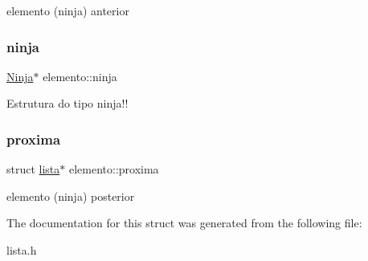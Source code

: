 elemento (ninja) anterior \mbox{\label{structelemento_af16aea73cc75aa4568de78596150bc05}} 
\subsubsection{\texorpdfstring{ninja}{ninja}}
{\footnotesize\ttfamily \mbox{\hyperlink{structninja}{Ninja}}$\ast$ elemento\+::ninja}

Estrutura do tipo ninja!! \mbox{\label{structelemento_a71d7ad5e15a4311eac4f33dc4b5d31d4}} 
\subsubsection{\texorpdfstring{proxima}{proxima}}
{\footnotesize\ttfamily struct \mbox{\hyperlink{structlista}{lista}}$\ast$ elemento\+::proxima}

elemento (ninja) posterior 

The documentation for this struct was generated from the following file\+:\begin{DoxyCompactItemize}
\item 
lista.\+h\end{DoxyCompactItemize}
